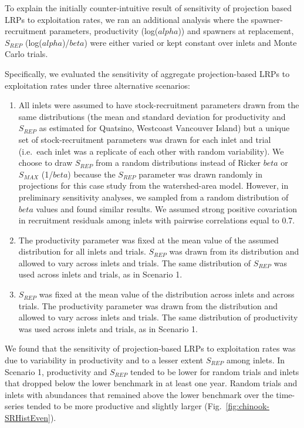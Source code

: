 \documentclass[11pt]{book}
\begin{document}
\clearpage

\label{app:ERsensitivity-appendix}

To explain the initially counter-intuitive result of sensitivity of projection based LRPs to exploitation rates, we ran an additional analysis where the spawner-recruitment parameters, productivity (log(\(alpha\))) and spawners at replacement, \(S_{REP}\) (log(\(alpha\))/\(beta\)) were either varied or kept constant over inlets and Monte Carlo trials.

Specifically, we evaluated the sensitivity of aggregate projection-based LRPs to exploitation rates under three alternative scenarios:
\begin{enumerate}
\def\labelenumi{\arabic{enumi}.}
\item
  All inlets were assumed to have stock-recruitment parameters drawn from the same distributions (the mean and standard deviation for productivity and \(S_{REP}\) as estimated for Quatsino, Westcoast Vancouver Island) but a unique set of stock-recruitment parameters was drawn for each inlet and trial (i.e.~each inlet was a replicate of each other with random variability). We choose to draw \(S_{REP}\) from a random distributions instead of Ricker \(beta\) or \(S_{MAX}\) (1/\(beta\)) because the \(S_{REP}\) parameter was drawn randomly in projections for this case study from the watershed-area model. However, in preliminary sensitivity analyses, we sampled from a random distribution of \(beta\) values and found similar results. We assumed strong positive covariation in recruitment residuals among inlets with pairwise correlations equal to 0.7.
\item
  The productivity parameter was fixed at the mean value of the assumed distribution for all inlets and trials. \(S_{REP}\) was drawn from its distribution and allowed to vary across inlets and trials. The same distribution of \(S_{REP}\) was used across inlets and trials, as in Scenario 1.
\item
  \(S_{REP}\) was fixed at the mean value of the distribution across inlets and across trials. The productivity parameter was drawn from the distribution and allowed to vary across inlets and trials. The same distribution of productivity was used across inlets and trials, as in Scenario 1.
\end{enumerate}
We found that the sensitivity of projection-based LRPs to exploitation rates was due to variability in productivity and to a lesser extent \(S_{REP}\) among inlets. In Scenario 1, productivity and \(S_{REP}\) tended to be lower for random trials and inlets that dropped below the lower benchmark in at least one year. Random trials and inlets with abundances that remained above the lower benchmark over the time-series tended to be more productive and slightly larger (Fig.~\ref{fig:chinook-SRHistEven}).
\end{document}

